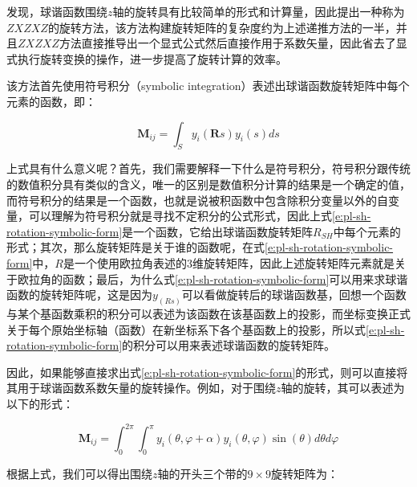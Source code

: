 \cite{a:FastArbitraryBRDFShadingforLowFrequencyLightingUsingSphericalHarmonics}发现，球谐函数围绕$z$轴的旋转具有比较简单的形式和计算量，因此提出一种称为$ZXZXZ$的旋转方法，该方法构建旋转矩阵的复杂度约为上述递推方法的一半，并且$ZXZXZ$方法直接推导出一个显式公式然后直接作用于系数矢量，因此省去了显式执行旋转变换的操作，进一步提高了旋转计算的效率。

该方法首先使用符号积分（symbolic integration）表述出球谐函数旋转矩阵中每个元素的函数，即：

\begin{equation}\label{e:pl-sh-rotation-symbolic-form}
	\mathbf{M}_{ij}=\int_S y_i(\mathbf{R}s)y_i(s)ds
\end{equation}

上式具有什么意义呢？首先，我们需要解释一下什么是符号积分，符号积分跟传统的数值积分具有类似的含义，唯一的区别是数值积分计算的结果是一个确定的值，而符号积分的结果是一个函数，也就是说被积函数中包含除积分变量以外的自变量，可以理解为符号积分就是寻找不定积分的公式形式，因此上式\ref{e:pl-sh-rotation-symbolic-form}是一个函数，它给出球谐函数旋转矩阵$R_{SH}$中每个元素的形式；其次，那么旋转矩阵是关于谁的函数呢，在式\ref{e:pl-sh-rotation-symbolic-form}中，$R$是一个使用欧拉角表述的3维旋转矩阵，因此上述旋转矩阵元素就是关于欧拉角的函数；最后，为什么式\ref{e:pl-sh-rotation-symbolic-form}可以用来求球谐函数的旋转矩阵呢，这是因为$y_(Rs)$可以看做旋转后的球谐函数基，回想一个函数与某个基函数乘积的积分可以表述为该函数在该基函数上的投影，而坐标变换正式关于每个原始坐标轴（函数）在新坐标系下各个基函数上的投影，所以式\ref{e:pl-sh-rotation-symbolic-form}的积分可以用来表述球谐函数的旋转矩阵。

因此，如果能够直接求出式\ref{e:pl-sh-rotation-symbolic-form}的形式，则可以直接将其用于球谐函数系数矢量的旋转操作。例如，对于围绕$z$轴的旋转，其可以表述为以下的形式：

\begin{equation}
	\mathbf{M}_{ij}=\int^{2\pi}_0\int^{\pi}_0y_i(\theta,\varphi+\alpha)y_i(\theta,\varphi)\sin(\theta)d\theta d\varphi
\end{equation}

根据上式，我们可以得出围绕$z$轴的开头三个带的$9\times 9$旋转矩阵为：

